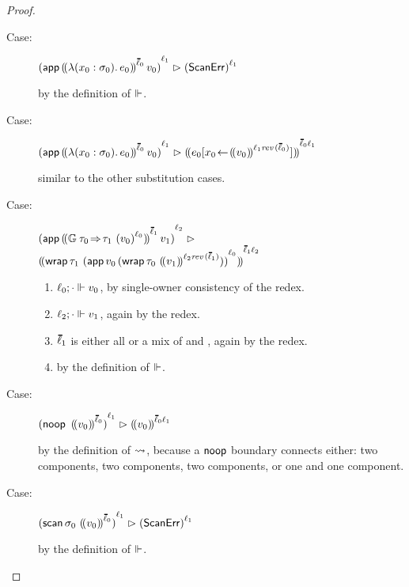\documentclass[ twoside,open=right,titlepage,numbers=noenddot,headinclude,%
                footinclude=true,cleardoublepage=empty,abstract=off,
                BCOR=5mm,paper=a4,fontsize=11pt,%
                ngerman,american,%
                parts,pdfspacing]{scrreprt}
\begin{document}
{\begin{proof}
\begin{description}
  \item[Case:]
    \(\obars{\eappu{\obbars{\efun{\tann{\svar_0}{\sshape_0}}{\sexpr_0}}{\sownerlist_0}}{\svalue_0}}{\sowner_1} \snr \obars{\sscanerror}{\sowner_1}\)
  \item[]
    by the definition of $\Vdash$.

  \item[Case:]
    \(\obars{\eappu{\obbars{\efun{\tann{\svar_0}{\sshape_0}}{\sexpr_0}}{\sownerlist_0}}{\svalue_0}}{\sowner_1} \snr \obbars{\esubst{\sexpr_0}{\svar_0}{\obbars{\svalue_0}{\fconcat{\sowner_1}{\frev{\sownerlist_0}}}}}{\fconcat{\sownerlist_0}{\sowner_1}}\)
  \item[]
    similar to the other substitution cases.

  \item[Case:]
    \(\obars{\eappu{\obbars{\emon{\tfun{\stype_0}{\stype_1}}{\obars{\svalue_0}{\sowner_0}}}{\sownerlist_1}}{\svalue_1}}{\sowner_2} \snr\)
    \\\qquad\(\obbars{\ewrap{\stype_1}{\obars{\eappu{\svalue_0}{(\ewrap{\stype_0}{\obbars{\svalue_1}{\fconcat{\sowner_2}{\frev{\sownerlist_1}}}})}}{\sowner_0}}}{\fconcat{\sownerlist_1}{\sowner_2}}\)
  \subitem
    \begin{enumerate}
    \item
      $\ell_0; \cdot \Vdash v_0$, by single-owner consistency of the redex.
    \item
      $\ell_2; \cdot \Vdash v_1$, again by the redex.
    \item
      $\sownerlist_1$ is either all \sdeep{} or a mix of \sshallow{} and \suntyped{}, again by the redex.
    \item
      by the definition of $\Vdash$.
    \end{enumerate}

  \item[Case:]
    \(\obars{\enoop{\obbars{\svalue_0}}{\sownerlist_0}}{\sowner_1} \snr \obbars{\svalue_0}{\fconcat{\sownerlist_0}{\sowner_1}}\)
  \item[]
    by the definition of $\rightsquigarrow$, because a $\mathsf{noop}{}$ boundary connects either:
     two \sdeep{} components, two \sshallow{} components, two \suntyped{} components, or one \sshallow{} and one \suntyped{} component.

  \item[Case:]
    \(\obars{\escan{\sshape_0}{\obbars{\svalue_0}{\sownerlist_0}}}{\sowner_1} \snr \obars{\sscanerror}{\sowner_1}\)
  \item[]
    by the definition of $\Vdash$.


\end{description}
\end{proof}}
\end{document}
